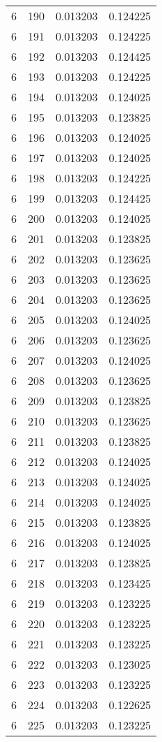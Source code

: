 \begin{longtable}{rrrr}
6 & 190 & 0.013203 & 0.124225 \\
6 & 191 & 0.013203 & 0.124225 \\
6 & 192 & 0.013203 & 0.124425 \\
6 & 193 & 0.013203 & 0.124225 \\
6 & 194 & 0.013203 & 0.124025 \\
6 & 195 & 0.013203 & 0.123825 \\
6 & 196 & 0.013203 & 0.124025 \\
6 & 197 & 0.013203 & 0.124025 \\
6 & 198 & 0.013203 & 0.124225 \\
6 & 199 & 0.013203 & 0.124425 \\
6 & 200 & 0.013203 & 0.124025 \\
6 & 201 & 0.013203 & 0.123825 \\
6 & 202 & 0.013203 & 0.123625 \\
6 & 203 & 0.013203 & 0.123625 \\
6 & 204 & 0.013203 & 0.123625 \\
6 & 205 & 0.013203 & 0.124025 \\
6 & 206 & 0.013203 & 0.123625 \\
6 & 207 & 0.013203 & 0.124025 \\
6 & 208 & 0.013203 & 0.123625 \\
6 & 209 & 0.013203 & 0.123825 \\
6 & 210 & 0.013203 & 0.123625 \\
6 & 211 & 0.013203 & 0.123825 \\
6 & 212 & 0.013203 & 0.124025 \\
6 & 213 & 0.013203 & 0.124025 \\
6 & 214 & 0.013203 & 0.124025 \\
6 & 215 & 0.013203 & 0.123825 \\
6 & 216 & 0.013203 & 0.124025 \\
6 & 217 & 0.013203 & 0.123825 \\
6 & 218 & 0.013203 & 0.123425 \\
6 & 219 & 0.013203 & 0.123225 \\
6 & 220 & 0.013203 & 0.123225 \\
6 & 221 & 0.013203 & 0.123225 \\
6 & 222 & 0.013203 & 0.123025 \\
6 & 223 & 0.013203 & 0.123225 \\
6 & 224 & 0.013203 & 0.122625 \\
6 & 225 & 0.013203 & 0.123225 \\

\end{longtable}
